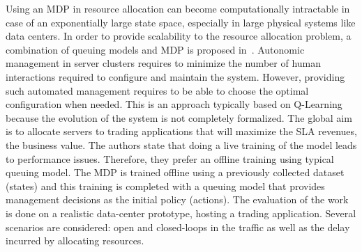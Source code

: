 Using an MDP in resource allocation can become computationally intractable in case of an exponentially large state space, especially in large physical systems like data centers. In order to provide scalability to the resource allocation problem, a combination of queuing models and MDP is proposed in~\cite{Tesauro2006}.
Autonomic management in server clusters requires to minimize the number of human interactions required to configure and maintain the system.
However, providing such automated management requires to be able to choose the optimal configuration when needed.
This is an approach typically based on Q-Learning because the evolution of the system is not completely formalized.
The global aim is to allocate servers to trading applications that will maximize the SLA revenues, \ie the business value.
The authors state that doing a live training of the model leads to performance issues. Therefore, they prefer an offline training using typical queuing model. The MDP is trained offline using a previously collected dataset (states) and this training is completed with a queuing model that provides management decisions as the initial policy (actions).
The evaluation of the work is done on a realistic data-center prototype, hosting a trading application. 
Several scenarios are considered: open and closed-loops in the traffic as well as the delay incurred by allocating resources.



